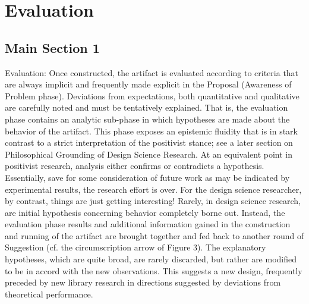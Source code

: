 
\chapter{Evaluation} %

\label{ChapterEvaluation} %


\section{Main Section 1}

Evaluation: Once constructed, the artifact is evaluated according to criteria that are always implicit and frequently made explicit in the Proposal (Awareness of Problem phase). Deviations from expectations, both quantitative and qualitative are carefully noted and must be tentatively explained. That is, the evaluation phase contains an analytic sub-phase in which hypotheses are made about the behavior of the artifact. This phase exposes an epistemic fluidity that is in stark contrast to a strict interpretation of the positivist stance; see a later section on Philosophical Grounding of Design Science Research. At an equivalent point in positivist research, analysis either confirms or contradicts a hypothesis. Essentially, save for some consideration of future work as may be indicated by experimental results, the research effort is over. For the design science researcher, by contrast, things are just getting interesting! Rarely, in design science research, are initial hypothesis concerning behavior completely borne out. Instead, the evaluation phase results and additional information gained in the construction and running of the artifact are brought together and fed back to another round of Suggestion (cf. the circumscription arrow of Figure 3). The explanatory hypotheses, which are quite broad, are rarely discarded, but rather are modified to be in accord with the new observations. This suggests a new design, frequently preceded by new library research in directions suggested by deviations from theoretical performance.
\cite{Vaishnavi2004}

